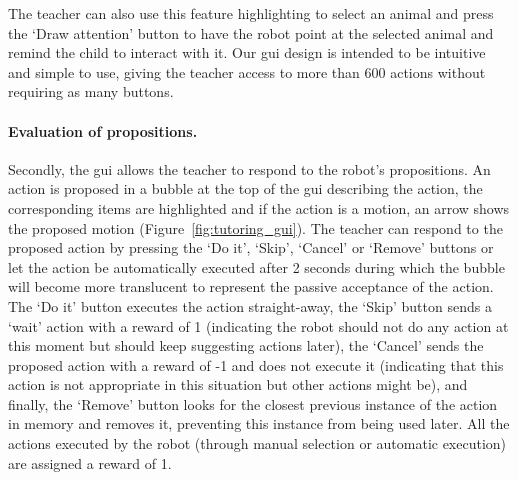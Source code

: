 The teacher can also use this feature highlighting to select an animal and press the `Draw attention' button to have the robot point at the selected animal and remind the child to interact with it.
Our \gls{gui} design is intended to be intuitive and simple to use, giving the teacher access to more than 600 actions without requiring as many buttons. %

\paragraph{Evaluation of propositions.} 
Secondly, the \gls{gui} allows the teacher to respond to the robot's propositions. An action is proposed in a bubble at the top of the \gls{gui} describing the action, the corresponding items are highlighted and if the action is a motion, an arrow shows the proposed motion (Figure~\ref{fig:tutoring_gui}). The teacher can respond to the proposed action by pressing the `Do it', `Skip', `Cancel' or `Remove' buttons or let the action be automatically executed after 2 seconds during which the bubble will become more translucent to represent the passive acceptance of the action. The `Do it' button executes the action straight-away, the `Skip' button sends a `wait' action with a reward of 1 (indicating the robot should not do any action at this moment but should keep suggesting actions later), the `Cancel' sends the proposed action with a reward of -1 and does not execute it (indicating that this action is not appropriate in this situation but other actions might be), and finally, the `Remove' button looks for the closest previous instance of the action in memory and removes it, preventing this instance from being used later. %
All the actions executed by the robot (through manual selection or automatic execution) are assigned a reward of 1. 


